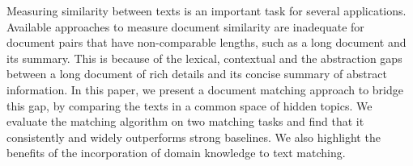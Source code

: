 Measuring similarity between texts is an important task for several applications. Available approaches to measure document similarity are inadequate for  document pairs that have non-comparable lengths, such as a long document and its summary. This is because of the lexical, contextual  and the abstraction gaps between a long document of rich details and its concise summary of abstract information. In this paper, we present a document matching approach to bridge this gap, by comparing the texts in a common space of hidden topics.  We evaluate the matching algorithm on two matching tasks  and find that it consistently and widely outperforms strong baselines. We also highlight the benefits of the incorporation of domain knowledge to text matching.
